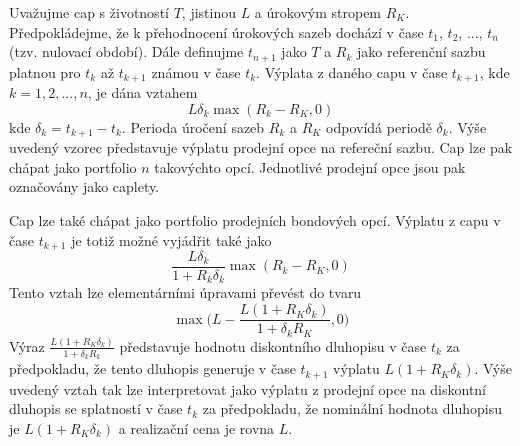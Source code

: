 \documentclass[a4paper]{book}
\begin{document}
Uvažujme cap s životností $T$, jistinou $L$ a úrokovým stropem $R_K$. Předpokládejme, že k přehodnocení úrokových sazeb dochází v čase $t_1$, $t_2$, ..., $t_n$ (tzv. nulovací období). Dále definujme $t_{n+1}$ jako $T$ a $R_k$ jako referenční sazbu platnou pro $t_k$ až $t_{k+1}$ známou v čase $t_k$. Výplata z daného capu v čase $t_{k+1}$, kde $k = 1, 2, ..., n$, je dána vztahem
\begin{equation}
L \delta_k \max(R_k - R_K,0)
\end{equation}
kde $\delta_k = t_{k+1} - t_k$. Perioda úročení sazeb $R_k$ a $R_K$ odpovídá periodě $\delta_k$. Výše uvedený vzorec představuje výplatu prodejní opce na refereční sazbu. Cap lze pak chápat jako portfolio $n$ takovýchto opcí. Jednotlivé prodejní opce jsou pak označovány jako caplety.

Cap lze také chápat jako portfolio prodejních bondových opcí. Výplatu z capu v čase $t_{k+1}$ je totiž možné vyjádřit také jako
\begin{equation*}
\frac{L \delta_k}{1+R_k \delta_k} \max(R_k - R_K, 0)
\end{equation*}
Tento vztah lze elementárními úpravami převést do tvaru
\begin{equation*}
\max \Big( L - \frac{L(1 + R_K \delta_k)}{1 + \delta_k R_K}, 0 \Big)
\end{equation*}
Výraz $\frac{L(1 + R_K \delta_k)}{1 + \delta_k R_k}$ představuje hodnotu diskontního dluhopisu v čase $t_k$ za předpokladu, že tento dluhopis generuje v čase $t_{k+1}$ výplatu $L(1+R_K \delta_k)$. Výše uvedený vztah tak lze interpretovat jako výplatu z prodejní opce na diskontní dluhopis se splatností v čase $t_k$ za předpokladu, že nominální hodnota dluhopisu je $L(1 + R_K \delta_k)$ a realizační cena je rovna $L$.\\
\end{document}
